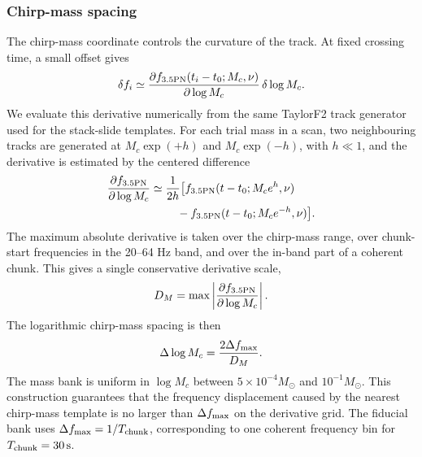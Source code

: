 \documentclass[aps,prd,amsmath,floats,floatfix, twocolumn,
superscriptaddress,nofootinbib,showpacs]{revtex4-2}
\begin{document}
\subsubsection{Chirp-mass spacing}
The chirp-mass coordinate controls the curvature of the track.  At fixed
crossing time, a small offset gives
\begin{equation}
\delta f_i
\simeq
\frac{\partial f_{\rm 3.5PN}(t_i-t_0;M_c,\nu)}
{\partial\log M_c}\,
\delta\log M_c .
\end{equation}
We evaluate this derivative numerically from the same TaylorF2 track
generator used for the stack-slide templates.  For each trial mass in a scan,
two neighbouring tracks are generated at
$M_c\exp(+h)$ and $M_c\exp(-h)$, with $h\ll1$, and the derivative is estimated
by the centered difference
\begin{equation}
\begin{aligned}
\frac{\partial f_{\rm 3.5PN}}{\partial\log M_c}
\simeq{}&
\frac{1}{2h}
\big[
f_{\rm 3.5PN}(t-t_0;M_c e^h,\nu)
\\
&\quad
-
f_{\rm 3.5PN}(t-t_0;M_c e^{-h},\nu)
\big].
\end{aligned}
\end{equation}
The maximum absolute derivative is taken over the chirp-mass range, over
chunk-start frequencies in the 20--64 Hz band, and over the in-band part of a
coherent chunk.  This gives a single conservative derivative scale,
\begin{equation}
D_M
=
\max
\left|
\frac{\partial f_{\rm 3.5PN}}{\partial\log M_c}
\right|.
\end{equation}
The logarithmic chirp-mass spacing is then
\begin{equation}
\Delta\log M_c
=
\frac{2\Delta f_{\rm max}}{D_M}.
\label{eq:mc_grid_condition}
\end{equation}
The mass bank is uniform in $\log M_c$ between
$5\times10^{-4}M_\odot$ and $10^{-1}M_\odot$.  This construction guarantees
that the frequency displacement caused by the nearest chirp-mass template is
no larger than $\Delta f_{\rm max}$ on the derivative grid.  The fiducial
bank uses $\Delta f_{\rm max}=1/T_{\rm chunk}$, corresponding to one coherent
frequency bin for $T_{\rm chunk}=30\,{\rm s}$.
\end{document}
